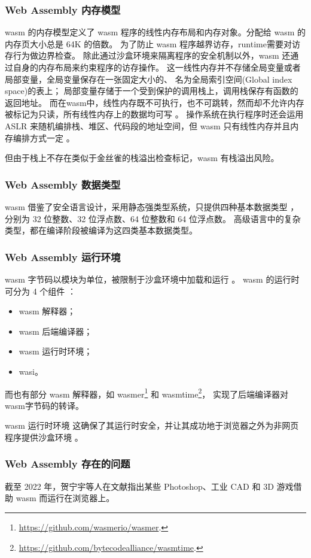     \subsubsection{Web Assembly 内存模型}
        wasm 的内存模型定义了 wasm 程序的线性内存布局和内存对象。分配给 wasm 的内存页大小总是 64K 的倍数\cite{Daniel2019DiscoveringVI}。
        为了防止 wasm 程序越界访存，runtime需要对访存行为做边界检查。
        除此通过沙盒环境来隔离程序的安全机制以外，wasm 还通过自身的内存布局来约束程序的访存操作。
        这一线性内存并不存储全局变量或者局部变量，全局变量保存在一张固定大小的、
        名为全局索引空间(Global index space)的表上\cite{rayOverviewWebAssemblyIoT2023, 
            webassemblycommunitygroupWebAssemblySpecification2024, Daniel2019DiscoveringVI}；
        局部变量存储于一个受到保护的调用栈上，调用栈保存有函数的返回地址。
        而在wasm中，线性内存既不可执行，也不可跳转，然而却不允许内存被标记为只读，所有线性内存上的数据均可写
        \cite{lehmannEverythingOldNew}。
        操作系统在执行程序时还会运用 ASLR 来随机编排栈、堆区、代码段的地址空间，但 wasm 只有线性内存并且内存编排方式一定
        \cite{lehmannEverythingOldNew}。

        但由于栈上不存在类似于金丝雀的栈溢出检查标记，wasm 有栈溢出风险。

    \subsubsection{Web Assembly 数据类型}
        wasm 借鉴了安全语言设计，采用静态强类型系统，只提供四种基本数据类型
        \cite{wasmCommunityGroup,lehmannEverythingOldNew, groupWebAssemblySpecification2024}，
        分别为 32 位整数、32 位浮点数、64 位整数和 64 位浮点数。
        高级语言中的复杂类型，都在编译阶段被编译为这四类基本数据类型。
    \subsubsection{Web Assembly 运行环境}
        wasm 字节码以模块为单位，被限制于沙盒环境中加载和运行
        \cite{johnsonWaVeVerifiablySecure2023,WasmbpfStreamliningEBPF2024,haasBringingWebSpeed2017}。
        wasm 的运行时可分为 4 个组件
        \cite{zhangResearchWebAssemblyRuntimes2024, zhangCharacterizingDetectingWebAssembly2024}：
        \begin{itemize}
            \item[(1)]  wasm 解释器；
            \item[(2)]  wasm 后端编译器；
            \item[(3)]  wasm 运行时环境；
            \item[(4)]  wasi。
        \end{itemize}
        而也有部分 wasm 解释器，如 wasmer\footnote[1]{\url{https://github.com/wasmerio/wasmer}.} 和
        wasmtime\footnote[2]{\url{https://github.com/bytecodealliance/wasmtime}.}，
        实现了后端编译器对wasm字节码的转译\cite{zhangResearchWebAssemblyRuntimes2024}。

        wasm 运行时环境
        这确保了其运行时安全，并让其成功地于浏览器之外为非网页程序提供沙盒环境
        \cite{narayanSwivelHardeningWebAssembly, WebAssemblySummaryOnSecurity}。
    \subsubsection{Web Assembly 存在的问题}
        截至 2022 年，贺宁宇等人在文献\parencite{caoWASMixerBinaryObfuscation2023}指出某些 Photoshop、工业 CAD 和 3D 游戏借助 wasm 而运行在浏览器上。
